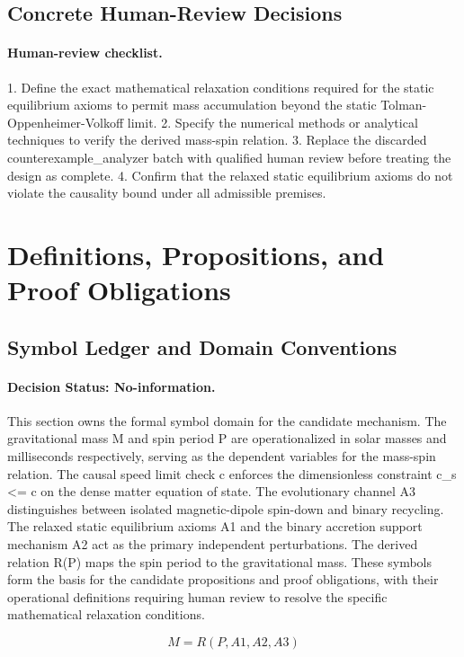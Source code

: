 \documentclass[conference]{IEEEtran}
\begin{document}
\subsection{Concrete Human-Review Decisions}
\paragraph{Human-review checklist.} 1. Define the exact mathematical relaxation conditions required for the static equilibrium axioms to permit mass accumulation beyond the static Tolman-Oppenheimer-Volkoff limit. 2. Specify the numerical methods or analytical techniques to verify the derived mass-spin relation. 3. Replace the discarded counterexample\_analyzer batch with qualified human review before treating the design as complete. 4. Confirm that the relaxed static equilibrium axioms do not violate the causality bound under all admissible premises.

\section{Definitions, Propositions, and Proof Obligations}
\subsection{Symbol Ledger and Domain Conventions}
\paragraph{Decision Status: No-information.} This section owns the formal symbol domain for the candidate mechanism. The gravitational mass M and spin period P are operationalized in solar masses and milliseconds respectively, serving as the dependent variables for the mass-spin relation. The causal speed limit check c enforces the dimensionless constraint c\_s <= c on the dense matter equation of state. The evolutionary channel A3 distinguishes between isolated magnetic-dipole spin-down and binary recycling. The relaxed static equilibrium axioms A1 and the binary accretion support mechanism A2 act as the primary independent perturbations. The derived relation R(P) maps the spin period to the gravitational mass. These symbols form the basis for the candidate propositions and proof obligations, with their operational definitions requiring human review to resolve the specific mathematical relaxation conditions.

\begin{equation}
M = R(P, A1, A2, A3)
\label{eq:definitions-and-propositions-def-equation-relation}
\end{equation}
\end{document}
